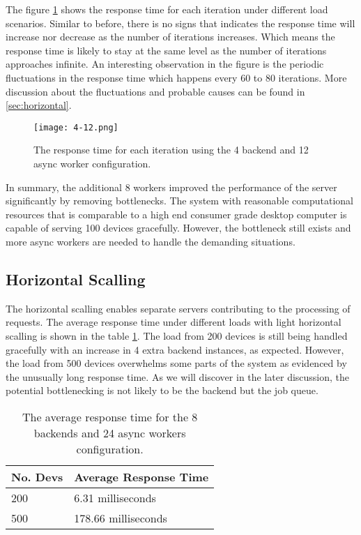 \documentclass[../thesis.tex]{subfiles}
\begin{document}
The figure \ref{fig:4-12} shows the response time for each iteration under different load scenarios. Similar to before, there is no signs that indicates the response time will increase nor decrease as the number of iterations increases. Which means the response time is likely to stay at the same level as the number of iterations approaches infinite. An interesting observation in the figure is the periodic fluctuations in the response time which happens every 60 to 80 iterations. More discussion about the fluctuations and probable causes can be found in \autoref{sec:horizontal}.

\begin{figure}[!ht]
	\centering
	\texttt{[image: 4-12.png]}
	\caption{The response time for each iteration using the 4 backend and 12 async worker configuration.}
	\label{fig:4-12}
\end{figure}

In summary, the additional 8 workers improved the performance of the server significantly by removing bottlenecks. The system with reasonable computational resources that is comparable to a high end consumer grade desktop computer is capable of serving 100 devices gracefully. However, the bottleneck still exists and more async workers are needed to handle the demanding situations. 

\subsection{Horizontal Scalling}
\label{sec:horizontal}

The horizontal scalling enables separate servers contributing to the processing of requests. The average response time under different loads with light horizontal scalling is shown in the table \ref{tab:avg8-24}. The load from 200 devices is still being handled gracefully with an increase in 4 extra backend instances, as expected. However, the load from 500 devices overwhelms some parts of the system as evidenced by the unusually long response time. As we will discover in the later discussion, the potential bottlenecking is not likely to be the backend but the job queue. 

\begin{table}[h!]
	\begin{center}
		\caption{The average response time for the 8 backends and 24 async workers configuration.}
		\label{tab:avg8-24}
		\begin{tabular}{l|l}
			\toprule
			\textbf{No. Devs} & \textbf{Average Response Time}\\
			\midrule
			200 & 6.31 milliseconds\\
			500 & 178.66 milliseconds\\
			\bottomrule
		\end{tabular}
	\end{center}
\end{table}
\end{document}
